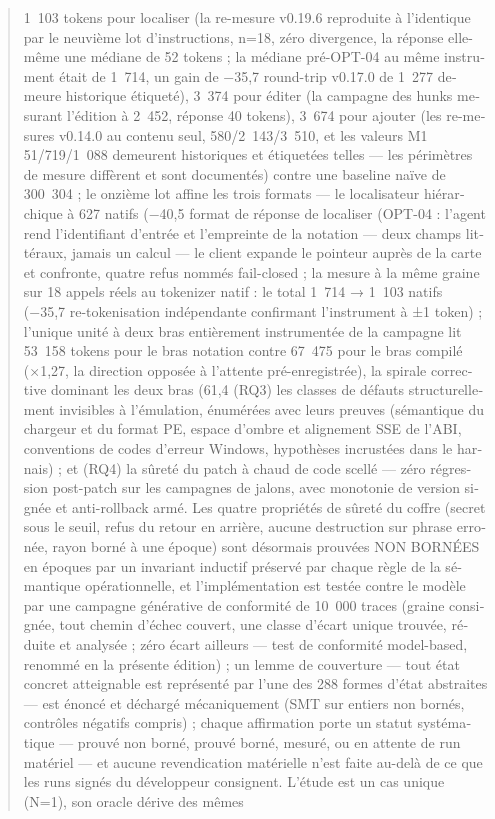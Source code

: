 \documentclass[11pt,a4paper]{article}
\begin{document}
\begin{otherlanguage}{french}
\begin{abstract}
1~103 tokens pour localiser (la re-mesure v0.19.6 reproduite à l'identique par le neuvième lot d'instructions,
n=18, zéro divergence, la réponse elle-même une médiane de 52 tokens ;
la médiane pré-OPT-04 au même instrument était de 1~714, un gain de
−35,7 %
round-trip v0.17.0 de 1~277 demeure historique étiqueté), 3~374 pour
éditer (la campagne des hunks mesurant l'édition à 2~452, réponse 40
tokens), 3~674 pour ajouter (les re-mesures v0.14.0 au contenu seul,
580/2~143/3~510, et les valeurs M1 51/719/1~088 demeurent historiques et
étiquetées telles — les
périmètres de mesure diffèrent et sont documentés) contre une baseline
naïve de 300~304 ; le onzième lot affine les trois formats — le localisateur hiérarchique à 627 natifs (−40,5 %
format de réponse de localiser (OPT-04 : l'agent rend l'identifiant
d'entrée et l'empreinte de la notation — deux champs littéraux, jamais un
calcul — le client expande le pointeur auprès de la carte et confronte,
quatre refus nommés fail-closed ; la mesure à la même graine sur 18
appels réels au tokenizer natif : le total 1~714 → 1~103 natifs
(−35,7 %
re-tokenisation indépendante confirmant l'instrument à ±1 token) ;
l'unique unité à deux
bras entièrement instrumentée de la campagne lit 53~158 tokens pour le
bras notation contre 67~475 pour le bras compilé (×1,27, la direction
opposée à l'attente pré-enregistrée), la spirale corrective dominant les
deux bras (61,4 %
(RQ3) les classes de défauts structurellement invisibles à l'émulation,
énumérées avec leurs preuves (sémantique du chargeur et du format PE,
espace d'ombre et alignement SSE de l'ABI, conventions de codes d'erreur
Windows, hypothèses incrustées dans le harnais) ; et (RQ4) la sûreté du
patch à chaud de code scellé — zéro régression post-patch sur les
campagnes de jalons, avec monotonie de version signée et anti-rollback
armé. Les quatre propriétés de sûreté du coffre (secret sous le seuil, refus du retour en arrière, aucune destruction sur phrase erronée, rayon borné à une époque) sont désormais prouvées NON BORNÉES en époques par un invariant inductif préservé par chaque règle de la sémantique opérationnelle, et l'implémentation est testée contre le modèle par une campagne générative de conformité de 10~000 traces (graine consignée, tout chemin d'échec couvert, une classe d'écart unique trouvée, réduite et analysée ; zéro écart ailleurs — test de conformité model-based, renommé en la présente édition) ; un lemme de couverture — tout état concret atteignable est représenté par l'une des 288 formes d'état abstraites — est énoncé et déchargé mécaniquement (SMT sur entiers non bornés, contrôles négatifs compris) ; chaque affirmation porte un statut systématique — prouvé non borné, prouvé borné, mesuré, ou en attente de run matériel — et aucune revendication matérielle n'est faite au-delà de ce que les runs signés du développeur consignent. L'étude est un cas unique (N=1), son oracle dérive des mêmes

\end{abstract}
\end{otherlanguage}
\end{document}
